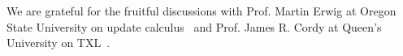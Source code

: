 \documentclass{sigplanconf}
\begin{document}



%


%












\acks We are grateful for the fruitful discussions with Prof. Martin
Erwig at Oregon State University on update
  calculus~\cite{updatecalculus} and Prof. James R. Cordy at Queen's
  University on TXL~\cite{txl}.




\end{document}
